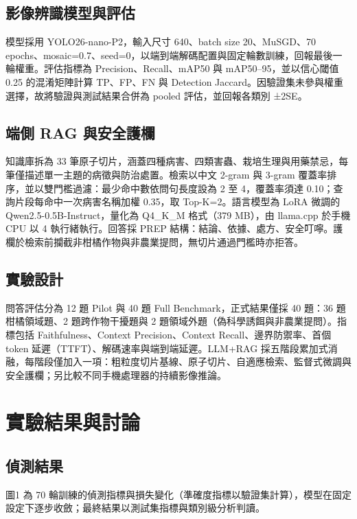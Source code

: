 \documentclass[10pt,twocolumn,a4paper]{article}
\begin{document}
\subsection{影像辨識模型與評估}
模型採用 YOLO26-nano-P2，輸入尺寸 640、batch size 20、MuSGD、70 epochs、mosaic=0.7、seed=0，以端到端解碼配置與固定輪數訓練，回報最後一輪權重。評估指標為 Precision、Recall、mAP50 與 mAP50–95，並以信心閾值 0.25 的混淆矩陣計算 TP、FP、FN 與 Detection Jaccard。因驗證集未參與權重選擇，故將驗證與測試結果合併為 pooled 評估，並回報各類別 ±2SE。

\subsection{端側 RAG 與安全護欄}
知識庫拆為 33 筆原子切片，涵蓋四種病害、四類害蟲、栽培生理與用藥禁忌，每筆僅描述單一主題的病徵與防治處置。檢索以中文 2-gram 與 3-gram 覆蓋率排序，並以雙門檻過濾：最少命中數依問句長度設為 2 至 4，覆蓋率須達 0.10；查詢片段每命中一次病害名稱加權 0.35，取 Top-K=2。語言模型為 LoRA 微調的 Qwen2.5-0.5B-Instruct，量化為 Q4\_K\_M 格式（379 MB），由 llama.cpp 於手機 CPU 以 4 執行緒執行。回答採 PREP 結構：結論、依據、處方、安全叮嚀。護欄於檢索前攔截非柑橘作物與非農業提問，無切片通過門檻時亦拒答。

\subsection{實驗設計}
問答評估分為 12 題 Pilot 與 40 題 Full Benchmark，正式結果僅採 40 題：36 題柑橘領域題、2 題跨作物干擾題與 2 題領域外題（偽科學誘餌與非農業提問）。指標包括 Faithfulness、Context Precision、Context Recall、邊界防禦率、首個 token 延遲（TTFT）、解碼速率與端到端延遲。LLM+RAG 採五階段累加式消融，每階段僅加入一項：粗粒度切片基線、原子切片、自適應檢索、監督式微調與安全護欄；另比較不同手機處理器的持續影像推論。

\section{實驗結果與討論}
\subsection{偵測結果}
圖1 為 70 輪訓練的偵測指標與損失變化（準確度指標以驗證集計算），模型在固定設定下逐步收斂；最終結果以測試集指標與類別級分析判讀。
\end{document}
